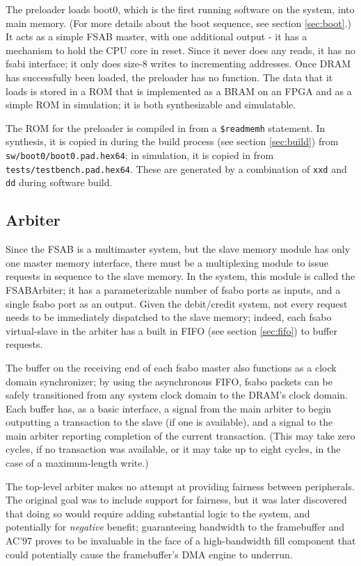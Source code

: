 \documentclass[10pt]{report}
\begin{document}
The preloader loads boot0, which is the first running software on the
system, into main memory.  (For more details about the boot sequence, see
section \ref{sec:boot}.) It acts as a simple FSAB master, with one
additional output - it has a mechanism to hold the CPU core in reset.  Since
it never does any reads, it has no fsabi interface; it only does size-8
writes to incrementing addresses.  Once DRAM has successfully been loaded,
the preloader has no function.  The data that it loads is stored in a ROM
that is implemented as a BRAM on an FPGA and as a simple ROM in simulation;
it is both synthesizable and simulatable.

The ROM for the preloader is compiled in from a \texttt{\$readmemh}
statement.  In synthesis, it is copied in during the build process (see
section \ref{sec:build}) from \texttt{sw/boot0/boot0.pad.hex64}; in
simulation, it is copied in from \texttt{tests/testbench.pad.hex64}.  These
are generated by a combination of \texttt{xxd} and \texttt{dd} during
software build.

\subsection{Arbiter}
\label{sec:arbiter}

Since the FSAB is a multimaster system, but the slave memory module has only
one master memory interface, there must be a multiplexing module to issue
requests in sequence to the slave memory.  In the system, this module is
called the FSABArbiter; it has a parameterizable number of fsabo ports as
inputs, and a single fsabo port as an output.  Given the debit/credit
system, not every request needs to be immediately dispatched to the slave
memory; indeed, each fsabo virtual-slave in the arbiter has a built in FIFO
(see section \ref{sec:fifo}) to buffer requests.

The buffer on the receiving end of each fsabo master also functions as a
clock domain synchronizer; by using the asynchronous FIFO, fsabo packets can
be safely transitioned from any system clock domain to the DRAM's clock
domain. Each buffer has, as a basic interface, a signal from the main
arbiter to begin outputting a transaction to the slave (if one is
available), and a signal to the main arbiter reporting completion of the
current transaction. (This may take zero cycles, if no transaction was
available, or it may take up to eight cycles, in the case of a
maximum-length write.)

The top-level arbiter makes no attempt at providing fairness between
peripherals.  The original goal was to include support for fairness, but it
was later discovered that doing so would require adding substantial logic to
the system, and potentially for \textit{negative} benefit; guaranteeing
bandwidth to the framebuffer and AC'97 proves to be invaluable in the face
of a high-bandwidth fill component that could potentially cause the
framebuffer's DMA engine to underrun.
\end{document}
